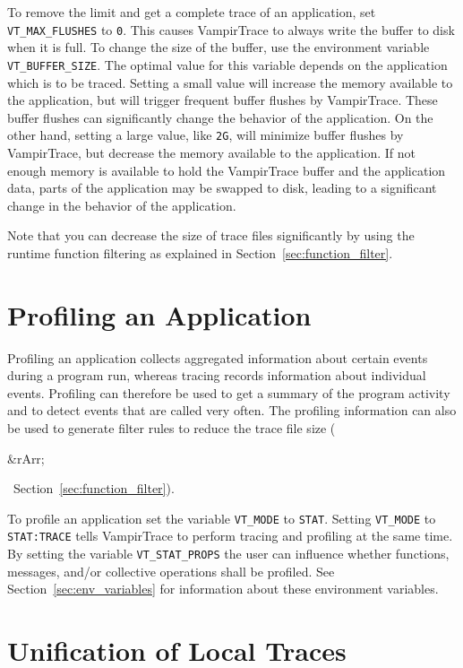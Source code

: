 \documentclass[a4paper,twoside,12pt,BCOR12mm]{scrbook}
\newcommand{\rarr}{$\Rightarrow$}  %
\renewcommand{\rarr}{\begin{rawhtml}&rArr;\end{rawhtml}}   %
\begin{document}
To remove the limit and get a complete trace of an application, set \latex{\linebreak}
\texttt{VT\_MAX\_FLUSHES} to \texttt{0}. This causes VampirTrace to always
write the buffer to disk when it is full. To change the size of the
buffer, use the environment variable \texttt{VT\_BUFFER\_SIZE}. The optimal value for
this variable depends on the application which is to be traced. Setting a
small value will increase the memory available to the application, but
will trigger frequent buffer flushes by VampirTrace. These buffer flushes can
significantly change the behavior of the application. On the other hand,
setting a large value, like \texttt{2G}, will minimize buffer flushes by
VampirTrace, but decrease the memory available to the application. If not
enough memory is available to hold the VampirTrace buffer and the application
data, parts of the application may be swapped to disk, leading
to a significant change in the behavior of the application.

Note that you can decrease the size of trace files significantly by
using the runtime function filtering as explained in Section~\ref{sec:function_filter}.


\section{Profiling an Application}
\label{sec:profiling}
Profiling an application collects aggregated information about certain events during 
a program run, whereas tracing records information about individual events.
Profiling can therefore be used to get a summary of the program activity and to detect events
that are called very often.
The profiling information can also be used to generate filter rules to reduce
the trace file size (\rarr\ Section~\ref{sec:function_filter}).

To profile an application set the variable \texttt{VT\_MODE} to \texttt{STAT}.
Setting \texttt{VT\_MODE} to \texttt{STAT:TRACE} tells VampirTrace to perform tracing and profiling at the same time.
By setting the variable \texttt{VT\_STAT\_PROPS} the user can influence whether functions, messages, and/or collective operations
shall be profiled. See Section~\ref{sec:env_variables} for information about these environment variables. 

\section{Unification of Local Traces}
\label{sec:unification}
\end{document}
